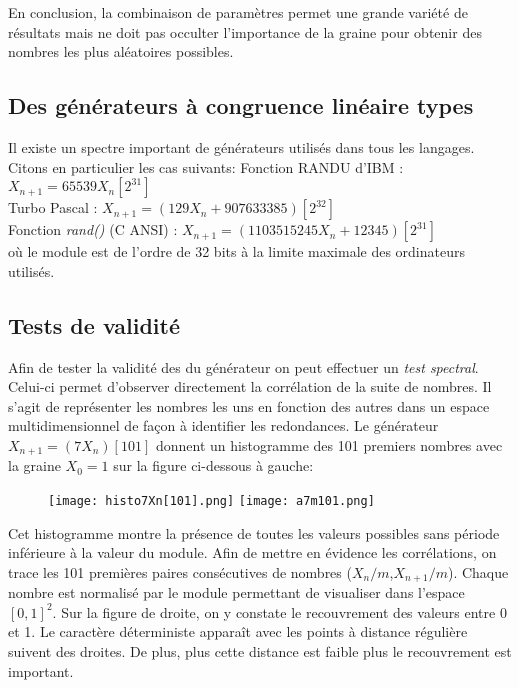 \documentclass{scrartcl}
\begin{document}
En conclusion, la combinaison de paramètres permet une grande variété de résultats mais ne doit pas occulter l'importance de la graine pour obtenir des nombres les plus aléatoires possibles.

\subsection{Des générateurs à congruence linéaire types}
Il existe un spectre important de générateurs utilisés dans tous les langages. Citons en particulier les cas suivants:
Fonction RANDU d'IBM : $X_{n+1} =65539 X_{n} [2^{31}]$\\
Turbo Pascal : $X_{n+1} =(129 X_{n} + 907633385)[2^{32}]$\\
Fonction \textit{ rand()} (C ANSI) : $X_{n+1} =(1103515245 X_{n}+12345) [2^{31}]$\\
où le module est de l'ordre de 32 bits à la limite maximale des ordinateurs utilisés.

\subsection{Tests de validité}
Afin de tester la validité des du générateur on peut effectuer un \textit{ test spectral}. Celui-ci permet d'observer directement la corrélation de la suite de nombres.
Il s'agit de représenter les nombres les uns en fonction des autres dans un espace multidimensionnel de façon à identifier les redondances.
Le générateur $X_{n+1} =(7 X_{n})[101]$ donnent un histogramme des 101 premiers nombres avec la graine $X_0 = 1$ sur la figure ci-dessous à gauche:
\begin{figure}
    \begin{center}
    \texttt{[image: histo7Xn[101].png]}
    \hspace{0.1\textwidth}
    \texttt{[image: a7m101.png]}
    \end{center}
  \end{figure}
Cet histogramme montre la présence de toutes les valeurs possibles sans période inférieure à la valeur du module.
Afin de mettre en évidence les corrélations, on trace les 101 premières paires consécutives de nombres ($X_n/m$,$X_{n+1}/m$). Chaque nombre est normalisé par le module permettant de visualiser dans l'espace $[0,1]^2$.
Sur la figure de droite, on y constate le recouvrement des valeurs entre 0 et 1. Le caractère déterministe apparaît avec les points à distance régulière suivent des droites. De plus, plus cette distance est faible plus le recouvrement est important.
\end{document}
